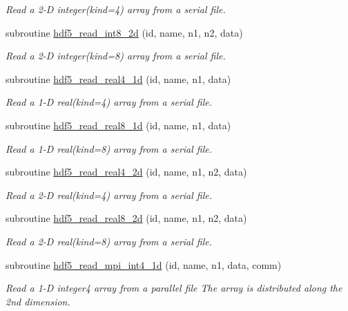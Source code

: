 \begin{DoxyCompactItemize}
\begin{DoxyCompactList}\small\item\em Read a 2-\/D integer(kind=4) array from a serial file. \end{DoxyCompactList}\item 
subroutine \hyperlink{namespacemodhdf5_a4ac00fa4fbae4c8a8f936ee48292e114}{hdf5\+\_\+read\+\_\+int8\+\_\+2d} (id, name, n1, n2, data)
\begin{DoxyCompactList}\small\item\em Read a 2-\/D integer(kind=8) array from a serial file. \end{DoxyCompactList}\item 
subroutine \hyperlink{namespacemodhdf5_ae087ad5b47b31640a477e5056aaf97e9}{hdf5\+\_\+read\+\_\+real4\+\_\+1d} (id, name, n1, data)
\begin{DoxyCompactList}\small\item\em Read a 1-\/D real(kind=4) array from a serial file. \end{DoxyCompactList}\item 
subroutine \hyperlink{namespacemodhdf5_a584fb8f065f2c6675049794e856b5085}{hdf5\+\_\+read\+\_\+real8\+\_\+1d} (id, name, n1, data)
\begin{DoxyCompactList}\small\item\em Read a 1-\/D real(kind=8) array from a serial file. \end{DoxyCompactList}\item 
subroutine \hyperlink{namespacemodhdf5_a36acd2df481965d7cb9c1b312fdff7b0}{hdf5\+\_\+read\+\_\+real4\+\_\+2d} (id, name, n1, n2, data)
\begin{DoxyCompactList}\small\item\em Read a 2-\/D real(kind=4) array from a serial file. \end{DoxyCompactList}\item 
subroutine \hyperlink{namespacemodhdf5_a7ba4b99f85945770344cdd73b713ea3a}{hdf5\+\_\+read\+\_\+real8\+\_\+2d} (id, name, n1, n2, data)
\begin{DoxyCompactList}\small\item\em Read a 2-\/D real(kind=8) array from a serial file. \end{DoxyCompactList}\item 
subroutine \hyperlink{namespacemodhdf5_a18b987f7a44198ccc7dd893cbdc322fc}{hdf5\+\_\+read\+\_\+mpi\+\_\+int4\+\_\+1d} (id, name, n1, data, comm)
\begin{DoxyCompactList}\small\item\em Read a 1-\/D integer4 array from a parallel file The array is distributed along the 2nd dimension. \end{DoxyCompactList}\item 

\end{DoxyCompactItemize}
